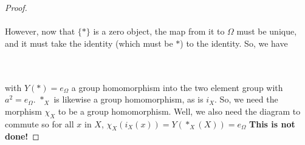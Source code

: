 \documentclass[12pt,letterpaper]{article}
\begin{document}
\begin{itemize}
\begin{proof}
\\\\
	However, now that $\{*\}$ is a zero object, the map from it to $\Omega$ must be unique, and it must take the identity (which must be $*$) to the identity. So, we have\\
	\\\\
		with $Y(*) = e_\Omega$ a group homomorphism into the two element group with $a^2 = e_\Omega$. $*_X$ is likewise a group homomorphism, as is $i_X$. So, we need the morphism $\chi_X$ to be a group homomorphism. Well, we also need the diagram to commute so for all $x$ in $X$, $\chi_X(i_X(x)) = Y(*_X(X)) = e_\Omega$
		\textbf{This is not done!}
	\end{proof}
\end{itemize}


\pagebreak
\end{document}
